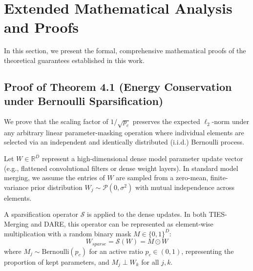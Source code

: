 \documentclass{article}
\theoremstyle{plain}
\theoremstyle{definition}
\theoremstyle{remark}
\begin{document}



\clearpage
\appendix
\onecolumn

\section{Extended Mathematical Analysis and Proofs}
\label{app:math_proofs}

In this section, we present the formal, comprehensive mathematical proofs of the theoretical guarantees established in this work.

\subsection{Proof of Theorem 4.1 (Energy Conservation under Bernoulli Sparsification)}
\label{app:proof_theorem_4_1}
We prove that the scaling factor of $1 / \sqrt{p_c}$ preserves the expected $\ell_2$-norm under any arbitrary linear parameter-masking operation where individual elements are selected via an independent and identically distributed (i.i.d.) Bernoulli process.

Let $W \in \mathbb{R}^D$ represent a high-dimensional dense model parameter update vector (e.g., flattened convolutional filters or dense weight layers). In standard model merging, we assume the entries of $W$ are sampled from a zero-mean, finite-variance prior distribution $W_j \sim \mathcal{P}(0, \sigma^2)$ with mutual independence across elements.

A sparsification operator $\mathcal{S}$ is applied to the dense updates. In both TIES-Merging and DARE, this operator can be represented as element-wise multiplication with a random binary mask $M \in \{0, 1\}^D$:
\begin{equation}
    W_{sparse} = \mathcal{S}(W) = M \odot W
\end{equation}
where $M_j \sim \text{Bernoulli}(p_c)$ for an active ratio $p_c \in (0,1)$, representing the proportion of kept parameters, and $M_j \perp W_k$ for all $j, k$.
\end{document}
